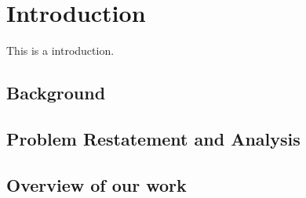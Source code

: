 \section{Introduction}  %

This is a introduction.

\subsection{Background}
\subsection{Problem Restatement and Analysis}
\subsection{Overview of our work}
